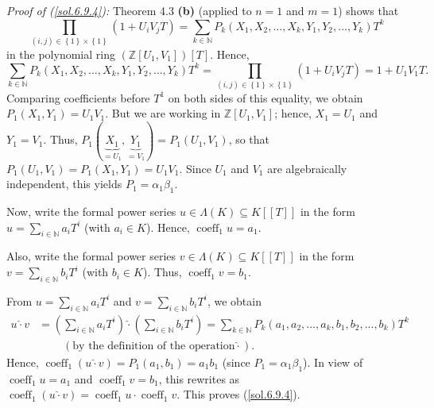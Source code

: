 \documentclass[numbers=enddot,12pt,final,onecolumn,notitlepage]{scrartcl}%
\begin{document}
\textit{Proof of (\ref{sol.6.9.4}):} Theorem 4.3 \textbf{(b)} (applied to
$n=1$ and $m=1$) shows that%
\[
\prod_{\left(  i,j\right)  \in\left\{  1\right\}  \times\left\{  1\right\}
}\left(  1+U_{i}V_{j}T\right)  =\sum_{k\in\mathbb{N}}P_{k}\left(  X_{1}%
,X_{2},\ldots,X_{k},Y_{1},Y_{2},\ldots,Y_{k}\right)  T^{k}%
\]
in the polynomial ring $\left(  \mathbb{Z}\left[  U_{1},V_{1}\right]  \right)
\left[  T\right]  $. Hence,%
\[
\sum_{k\in\mathbb{N}}P_{k}\left(  X_{1},X_{2},\ldots,X_{k},Y_{1},Y_{2}%
,\ldots,Y_{k}\right)  T^{k}=\prod_{\left(  i,j\right)  \in\left\{  1\right\}
\times\left\{  1\right\}  }\left(  1+U_{i}V_{j}T\right)  =1+U_{1}V_{1}T.
\]
Comparing coefficients before $T^{1}$ on both sides of this equality, we
obtain $P_{1}\left(  X_{1},Y_{1}\right)  =U_{1}V_{1}$. But we are working in
$\mathbb{Z}\left[  U_{1},V_{1}\right]  $; hence, $X_{1}=U_{1}$ and
$Y_{1}=V_{1}$. Thus, $P_{1}\left(  \underbrace{X_{1}}_{=U_{1}}%
,\underbrace{Y_{1}}_{=V_{1}}\right)  =P_{1}\left(  U_{1},V_{1}\right)  $, so
that $P_{1}\left(  U_{1},V_{1}\right)  =P_{1}\left(  X_{1},Y_{1}\right)
=U_{1}V_{1}$. Since $U_{1}$ and $V_{1}$ are algebraically independent, this
yields $P_{1}=\alpha_{1}\beta_{1}$.

Now, write the formal power series $u\in\Lambda\left(  K\right)  \subseteq
K\left[  \left[  T\right]  \right]  $ in the form $u=\sum_{i\in\mathbb{N}%
}a_{i}T^{i}$ (with $a_{i}\in K$). Hence, $\operatorname*{coeff}\nolimits_{1}%
u=a_{1}$.

Also, write the formal power series $v\in\Lambda\left(  K\right)  \subseteq
K\left[  \left[  T\right]  \right]  $ in the form $v=\sum_{i\in\mathbb{N}%
}b_{i}T^{i}$ (with $b_{i}\in K$). Thus, $\operatorname*{coeff}\nolimits_{1}%
v=b_{1}$.

From $u=\sum_{i\in\mathbb{N}}a_{i}T^{i}$ and $v=\sum_{i\in\mathbb{N}}%
b_{i}T^{i}$, we obtain%
\begin{align*}
u\widehat{\cdot}v  &  =\left(  \sum_{i\in\mathbb{N}}a_{i}T^{i}\right)
\widehat{\cdot}\left(  \sum_{i\in\mathbb{N}}b_{i}T^{i}\right)  =\sum
_{k\in\mathbb{N}}P_{k}\left(  a_{1},a_{2},...,a_{k},b_{1},b_{2},...,b_{k}%
\right)  T^{k}\\
&  \ \ \ \ \ \ \ \ \ \ \left(  \text{by the definition of the operation
}\widehat{\cdot}\right)  .
\end{align*}
Hence, $\operatorname*{coeff}\nolimits_{1}\left(  u\widehat{\cdot}v\right)
=P_{1}\left(  a_{1},b_{1}\right)  =a_{1}b_{1}$ (since $P_{1}=\alpha_{1}%
\beta_{1}$). In view of $\operatorname*{coeff}\nolimits_{1}u=a_{1}$ and
$\operatorname*{coeff}\nolimits_{1}v=b_{1}$, this rewrites as
$\operatorname*{coeff}\nolimits_{1}\left(  u\widehat{\cdot}v\right)
=\operatorname*{coeff}\nolimits_{1}u\cdot\operatorname*{coeff}\nolimits_{1}v$.
This proves (\ref{sol.6.9.4}).
\end{document}
